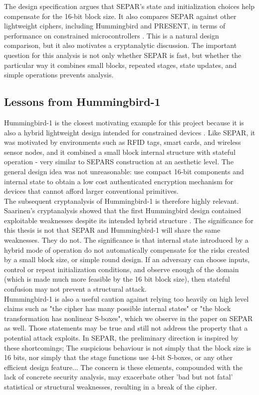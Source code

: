 \documentclass[11pt]{article}
\begin{document}
The design specification argues that SEPAR's state and initialization choices help compensate for the 16-bit block size. It also compares SEPAR against other lightweight ciphers, including Hummingbird and PRESENT, in terms of performance on constrained microcontrollers \cite{VahiJassbi2020}. This is a natural design comparison, but it also motivates a cryptanalytic discussion. The important question for this analysis is not only whether SEPAR is fast, but whether the particular way it combines small blocks, repeated stages, state updates, and simple operations prevents analysis.

\subsection{Lessons from Hummingbird-1}

Hummingbird-1 is the closest motivating example for this project because it is also a hybrid lightweight design intended for constrained devices \cite{Engels2010}. Like SEPAR, it was motivated by environments such as RFID tags, smart cards, and wireless sensor nodes, and it combined a small block internal structure with stateful operation - very similar to SEPARS construction at an aesthetic level. The general design idea was not unreasonable: use compact 16-bit components and internal state to obtain a low cost authenticated encryption mechanism for devices that cannot afford larger conventional primitives.\\

The subsequent cryptanalysis of Hummingbird-1 is therefore highly relevant. Saarinen's cryptanalysis showed that the first Hummingbird design contained exploitable weaknesses despite its intended hybrid structure \cite{Saarinen2011}. The significance for this thesis is not that SEPAR and Hummingbird-1 will share the same weaknesses. They do not. The significance is that internal state introduced by a hybrid mode of operation do not automatically compensate for the risks created by a small block size, or simple round design. If an adversary can choose inputs, control or repeat initialization conditions, and observe enough of the domain (which is made much more feasible by the 16 bit block size), then stateful confusion may not prevent a structural attack.\\

Hummingbird-1 is also a useful caution against relying too heavily on high level claims such as "the cipher has many possible internal states" or "the block transformation has nonlinear S-boxes", which we observe in the paper on SEPAR as well. Those statements may be true and still not address the property that a potential attack exploits. In SEPAR, the preliminary direction is inspired by these shortcomings; The suspicious behaviour is not simply that the block size is 16 bits, nor simply that the stage functions use 4-bit S-boxes, or any other efficient design feature... The concern is these elements, compounded with the lack of concrete security analysis, may exacerbate other 'bad but not fatal' statistical or structural weaknesses, resulting in a break of the cipher.\\
\end{document}
